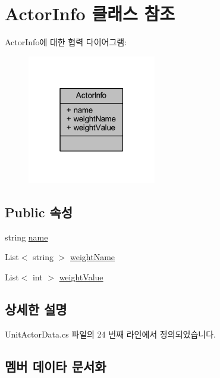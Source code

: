 \hypertarget{class_actor_info}{}\section{Actor\+Info 클래스 참조}
\label{class_actor_info}


Actor\+Info에 대한 협력 다이어그램\+:\nopagebreak
\begin{figure}[H]
\begin{center}
\leavevmode
\includegraphics[width=159pt]{class_actor_info__coll__graph}
\end{center}
\end{figure}
\subsection*{Public 속성}
\begin{DoxyCompactItemize}
\item 
string \hyperlink{class_actor_info_a2e9e540cdc037f204d80622e47543410}{name}
\item 
List$<$ string $>$ \hyperlink{class_actor_info_a25bb8e0eafab630572ffddea088a1f80}{weight\+Name}
\item 
List$<$ int $>$ \hyperlink{class_actor_info_a1c5dd2d46e5ebc5a6483f2bcb55cb162}{weight\+Value}
\end{DoxyCompactItemize}


\subsection{상세한 설명}


Unit\+Actor\+Data.\+cs 파일의 24 번째 라인에서 정의되었습니다.



\subsection{멤버 데이타 문서화}
